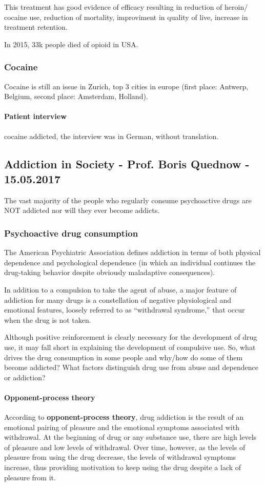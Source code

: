 \documentclass[12pt,article,oneside,a4paper]{memoir}
\begin{document}
This treatment has good evidence of efficacy resulting in reduction of heroin/
cocaine use, reduction of mortality, improviment in quality of live, increase
in treatment retention.

In 2015, 33k people died of opioid in USA.

\subsubsection{Cocaine}
Cocaine is still an issue in Zurich, top 3 cities in europe
(first place: Antwerp, Belgium, second place: Amsterdam, Holland).

\paragraph{Patient interview} cocaine addicted, the interview was in German,
without translation.

\subsection{Addiction in Society - Prof. Boris Quednow - 15.05.2017}

The vast majority of the people who regularly consume psychoactive drugs are
NOT addicted nor will they ever become addicts.

\subsubsection{Psychoactive drug consumption}

The American Psychiatric Association defines addiction in terms of both physical
dependence and psychological dependence (in which an individual continues the
drug-taking behavior despite obviously maladaptive consequences).

In addition to a compulsion to take the agent of abuse, a major feature of
addiction for many drugs is a constellation of negative physiological and
emotional features, loosely referred to as “withdrawal syndrome,” that occur
when the drug is not taken. 

Although positive reinforcement is clearly necessary for the development of drug
use, it may fall short in explaining the development of compulsive use. So, what
drives the drug consumption in some people and why/how do some of them become
addicted? What factors distinguish drug use from abuse and dependence or
addiction?

\paragraph{Opponent-process theory}
According to \textbf{opponent-process theory}, drug addiction is the result of
an emotional pairing of pleasure and the emotional symptoms associated with
withdrawal. At the beginning of drug or any substance use, there are high levels
of pleasure and low levels of withdrawal. Over time, however, as the levels of
pleasure from using the drug decrease, the levels of withdrawal symptoms
increase, thus providing motivation to keep using the drug despite a lack of
pleasure from it.
\end{document}
